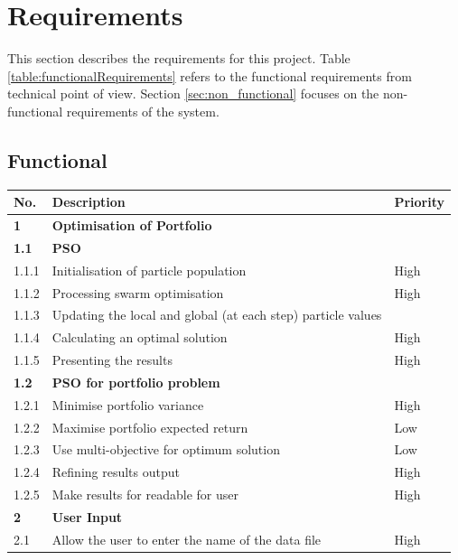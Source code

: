 \documentclass{pdfmx4020}
\begin{document}
  

\chapter{Requirements}
This section describes the requirements for this project. Table \ref{table:functionalRequirements} refers to the functional requirements from technical point of view. Section \ref{sec:non_functional} focuses on the non-functional requirements of the system. 
  \section{Functional} %
  \label{sec:functional}
  \begin{table}[ht]
    \setlength{\extrarowheight}{2.0pt}
    \begin{tabular}{|l|l|l|}
      \hline
      No. & Description & Priority \\
      \hline
      \textbf{1} & \textbf{Optimisation of Portfolio} & \\
      \hline 
      \textbf{1.1} & \textbf{PSO} & \\
      \hline 
      1.1.1 & Initialisation of particle population & High \\
      \hline 
      1.1.2 & Processing swarm optimisation & High \\
      \hline 
      1.1.3 & Updating the local and global (at each step) particle values& \\
      \hline 
      1.1.4 & Calculating an optimal solution & High \\
      \hline 
      1.1.5 & Presenting the results & High \\
      \hline 
      \textbf{1.2} & \textbf{PSO for portfolio problem } & \\
      \hline 
      1.2.1 & Minimise portfolio variance & High \\
      \hline 
      1.2.2 & Maximise portfolio expected return & Low \\
      \hline 
      1.2.3 & Use multi-objective for optimum solution & Low \\
      \hline 
      1.2.4 & Refining results output & High \\
      \hline 
      1.2.5 & Make results for readable for user & High \\
      \hline 
      \textbf{2} & \textbf{User Input} & \\
      \hline
      2.1 & Allow the user to enter the name of the data file & High \\

\end{tabular}
\end{table}
\end{document}
